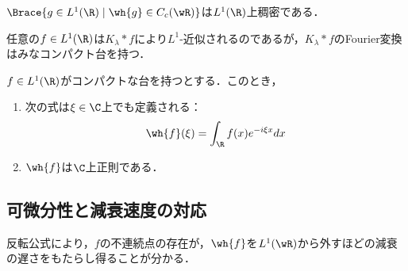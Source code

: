 \documentclass[uplatex,dvipdfmx]{jsreport}
\begin{document}
\begin{corollary}[Fourier変換は大抵コンパクト台を持つ]
    $\Brace{g\in L^1(\R)\mid\wh{g}\in C_c(\wR)}$は$L^1(\R)$上稠密である．
\end{corollary}
\begin{Proof}
    任意の$f\in L^1(\R)$は$K_\lambda*f$により$L^1$-近似されるのであるが，$K_\lambda*f$のFourier変換はみなコンパクト台を持つ．
\end{Proof}

\begin{proposition}[コンパクト台を持つ関数のFourier変換]\label{prop-fourier-transform-of-functions-with-compact-support}
    $f\in L^1(\R)$がコンパクトな台を持つとする．このとき，
    \begin{enumerate}
        \item 次の式は$\xi\in\C$上でも定義される：
        \[\wh{f}(\xi)=\int_\R f(x)e^{-i\xi x}dx\]
        \item $\wh{f}$は$\C$上正則である．
    \end{enumerate}
\end{proposition}

\subsection{可微分性と減衰速度の対応}

\begin{tcolorbox}[colframe=ForestGreen, colback=ForestGreen!10!white,breakable,colbacktitle=ForestGreen!40!white,coltitle=black,fonttitle=\bfseries\sffamily,
title=]
    反転公式により，$f$の不連続点の存在が，$\wh{f}$を$L^1(\wR)$から外すほどの減衰の遅さをもたらし得ることが分かる．
\end{tcolorbox}
\end{document}

